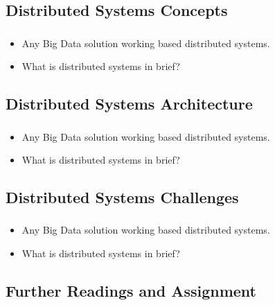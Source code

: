 \subsection{Distributed Systems Concepts}
\begin{frame}
\frametitle{\subsecname}
\begin{itemize} 
	\item Any Big Data solution working based distributed systems.
	\item What is distributed systems in brief?
\end{itemize}
\end{frame}




\subsection{Distributed Systems Architecture}
\begin{frame}
\frametitle{\subsecname}
\begin{itemize} 
	\item Any Big Data solution working based distributed systems.
	\item What is distributed systems in brief?
\end{itemize}
\end{frame}



\subsection{Distributed Systems Challenges}
\begin{frame}
\frametitle{\subsecname}
\begin{itemize} 
	\item Any Big Data solution working based distributed systems.
	\item What is distributed systems in brief?
\end{itemize}
\end{frame}





\subsection{Further Readings and Assignment}

